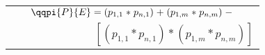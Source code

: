 \scriptsize
\begin{tabular}{@{}c@{}}
$\qqpi{P}{E} = \left( p_{1,1} \mathrel{*} p_{n,1} \right) \mathrel{+} \left( p_{1,m} \mathrel{*} p_{n,m} \right) \mathrel{-}$\\
\ \ \ \ \ \ \ \ \ \ \ \ \ \ \ $[ \left(p_{1,1} \mathrel{*} p_{n,1}\right) \mathrel{*} \left(p_{1,m} \mathrel{*} p_{n,m}\right)]$
\end{tabular}